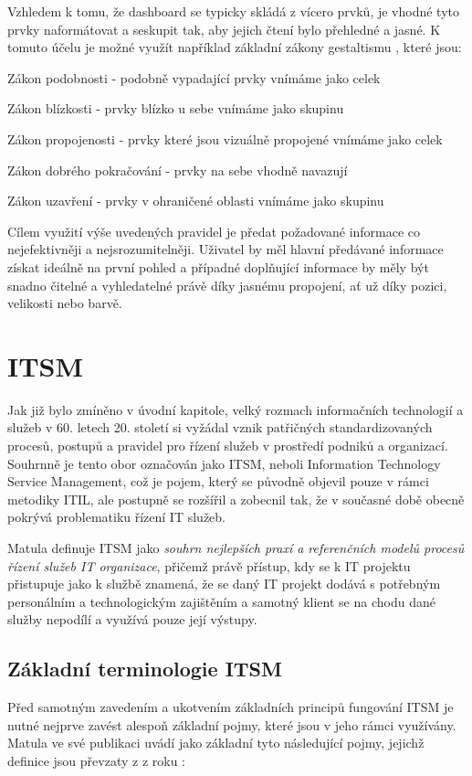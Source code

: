\documentclass[
  digital,     %
  twoside,     %
  lof,         %
  lot,         %
]{fithesis4}
\begin{document}
Vzhledem k tomu, že dashboard se typicky skládá z vícero prvků, je vhodné tyto prvky naformátovat a seskupit tak, aby jejich čtení bylo přehledné a jasné. K tomuto účelu je možné využít například základní zákony gestaltismu \parencite[s.73]{Marek2015thesis}, které jsou:
\begin{compactitem}
    \item Zákon podobnosti - podobně vypadající prvky vnímáme jako celek
    \item Zákon blízkosti - prvky blízko u sebe vnímáme jako skupinu
    \item Zákon propojenosti - prvky které jsou vizuálně propojené vnímáme jako celek
    \item Zákon dobrého pokračování - prvky na sebe vhodně navazují
    \item Zákon uzavření - prvky v ohraničené oblasti vnímáme jako skupinu
\end{compactitem}  

Cílem využití výše uvedených pravidel je předat požadované informace co nejefektivněji a nejsrozumitelněji. Uživatel by měl hlavní předávané informace získat ideálně na první pohled a případné doplňující informace by měly být snadno čitelné a vyhledatelné právě díky jasnému propojení, ať už díky pozici, velikosti nebo barvě. 

\chapter{ITSM}
Jak již bylo zmíněno v úvodní kapitole, velký rozmach informačních technologií a služeb v 60. letech 20. století si vyžádal vznik patřičných standardizovaných procesů, postupů a pravidel pro řízení služeb v prostředí podniků a organizací. Souhrnně je tento obor označován jako ITSM, neboli Information Technology Service Management, což je pojem, který se původně objevil pouze v rámci metodiky ITIL, ale postupně se rozšířil a zobecnil tak, že v současné době obecně pokrývá problematiku řízení IT služeb.\parencite[s.~20]{Matula2017} 

Matula definuje ITSM jako \textit{souhrn nejlepších praxí a referenčních modelů procesů řízení služeb IT organizace}, přičemž právě přístup, kdy se k IT projektu přistupuje jako k službě znamená, že se daný IT projekt dodává s potřebným personálním a technologickým zajištěním a samotný klient se na chodu dané služby nepodílí a využívá pouze její výstupy.\parencite[s.~20-22]{Matula2017}

\section{Základní terminologie ITSM}
Před samotným zavedením a ukotvením základních principů fungování ITSM je nutné nejprve zavést alespoň základní pojmy, které jsou v jeho rámci využívány. Matula ve své publikaci  uvádí jako základní tyto následující pojmy, jejichž definice jsou převzaty z  z roku \citeyear{SyFvQA11lk1OaIec}:
\end{document}
